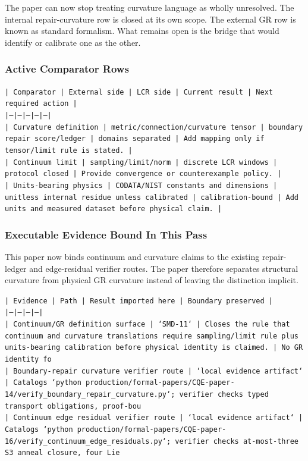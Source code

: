 \documentclass[11pt]{article}
\begin{document}
The paper can now stop treating curvature language as wholly unresolved. The internal repair-curvature row is closed at its own scope. The external GR row is known as standard formalism. What remains open is the bridge that would identify or calibrate one as the other.

\subsubsection*{Active Comparator Rows}

\noindent\texttt{| Comparator | External side | LCR side | Current result | Next required action |}\\
\noindent\texttt{|---|---|---|---|---|}\\
\noindent\texttt{| Curvature definition | metric/connection/curvature tensor | boundary repair score/ledger | domains separated | Add mapping only if tensor/limit rule is stated. |}\\
\noindent\texttt{| Continuum limit | sampling/limit/norm | discrete LCR windows | protocol closed | Provide convergence or counterexample policy. |}\\
\noindent\texttt{| Units-bearing physics | CODATA/NIST constants and dimensions | unitless internal residue unless calibrated | calibration-bound | Add units and measured dataset before physical claim. |}\\

\subsubsection*{Executable Evidence Bound In This Pass}

This paper now binds continuum and curvature claims to the existing repair-ledger and edge-residual verifier routes. The paper therefore separates structural curvature from physical GR curvature instead of leaving the distinction implicit.

\noindent\texttt{| Evidence | Path | Result imported here | Boundary preserved |}\\
\noindent\texttt{|---|---|---|---|}\\
\noindent\texttt{| Continuum/GR definition surface | `SMD-11` | Closes the rule that continuum and curvature translations require sampling/limit rule plus units-bearing calibration before physical identity is claimed. | No GR identity fo}\\
\noindent\texttt{| Boundary-repair curvature verifier route | `local evidence artifact` | Catalogs `python production/formal-papers/CQE-paper-14/verify\_boundary\_repair\_curvature.py`; verifier checks typed transport obligations, proof-bou}\\
\noindent\texttt{| Continuum edge residual verifier route | `local evidence artifact` | Catalogs `python production/formal-papers/CQE-paper-16/verify\_continuum\_edge\_residuals.py`; verifier checks at-most-three S3 anneal closure, four Lie}\\
\end{document}
